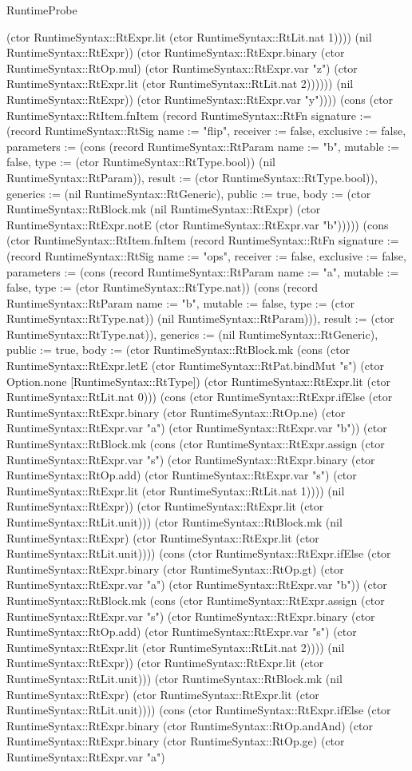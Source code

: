 \begin{lexlean}{RuntimeProbe}
\begin{semanticmodule}
{(ctor RuntimeSyntax::RtExpr.lit (ctor RuntimeSyntax::RtLit.nat 1)))) (nil RuntimeSyntax::RtExpr)) (ctor RuntimeSyntax::RtExpr.binary (ctor RuntimeSyntax::RtOp.mul) (ctor RuntimeSyntax::RtExpr.var "z") (ctor RuntimeSyntax::RtExpr.lit (ctor RuntimeSyntax::RtLit.nat 2)))))) (nil RuntimeSyntax::RtExpr)) (ctor RuntimeSyntax::RtExpr.var "y"))})) (cons (ctor RuntimeSyntax::RtItem.fnItem (record RuntimeSyntax::RtFn {signature := (record RuntimeSyntax::RtSig {name := "flip", receiver := false, exclusive := false, parameters := (cons (record RuntimeSyntax::RtParam {name := "b", mutable := false, type := (ctor RuntimeSyntax::RtType.bool)}) (nil RuntimeSyntax::RtParam)), result := (ctor RuntimeSyntax::RtType.bool)}), generics := (nil RuntimeSyntax::RtGeneric), public := true, body := (ctor RuntimeSyntax::RtBlock.mk (nil RuntimeSyntax::RtExpr) (ctor RuntimeSyntax::RtExpr.notE (ctor RuntimeSyntax::RtExpr.var "b")))})) (cons (ctor RuntimeSyntax::RtItem.fnItem (record RuntimeSyntax::RtFn {signature := (record RuntimeSyntax::RtSig {name := "ops", receiver := false, exclusive := false, parameters := (cons (record RuntimeSyntax::RtParam {name := "a", mutable := false, type := (ctor RuntimeSyntax::RtType.nat)}) (cons (record RuntimeSyntax::RtParam {name := "b", mutable := false, type := (ctor RuntimeSyntax::RtType.nat)}) (nil RuntimeSyntax::RtParam))), result := (ctor RuntimeSyntax::RtType.nat)}), generics := (nil RuntimeSyntax::RtGeneric), public := true, body := (ctor RuntimeSyntax::RtBlock.mk (cons (ctor RuntimeSyntax::RtExpr.letE (ctor RuntimeSyntax::RtPat.bindMut "s") (ctor Option.none [RuntimeSyntax::RtType]) (ctor RuntimeSyntax::RtExpr.lit (ctor RuntimeSyntax::RtLit.nat 0))) (cons (ctor RuntimeSyntax::RtExpr.ifElse (ctor RuntimeSyntax::RtExpr.binary (ctor RuntimeSyntax::RtOp.ne) (ctor RuntimeSyntax::RtExpr.var "a") (ctor RuntimeSyntax::RtExpr.var "b")) (ctor RuntimeSyntax::RtBlock.mk (cons (ctor RuntimeSyntax::RtExpr.assign (ctor RuntimeSyntax::RtExpr.var "s") (ctor RuntimeSyntax::RtExpr.binary (ctor RuntimeSyntax::RtOp.add) (ctor RuntimeSyntax::RtExpr.var "s") (ctor RuntimeSyntax::RtExpr.lit (ctor RuntimeSyntax::RtLit.nat 1)))) (nil RuntimeSyntax::RtExpr)) (ctor RuntimeSyntax::RtExpr.lit (ctor RuntimeSyntax::RtLit.unit))) (ctor RuntimeSyntax::RtBlock.mk (nil RuntimeSyntax::RtExpr) (ctor RuntimeSyntax::RtExpr.lit (ctor RuntimeSyntax::RtLit.unit)))) (cons (ctor RuntimeSyntax::RtExpr.ifElse (ctor RuntimeSyntax::RtExpr.binary (ctor RuntimeSyntax::RtOp.gt) (ctor RuntimeSyntax::RtExpr.var "a") (ctor RuntimeSyntax::RtExpr.var "b")) (ctor RuntimeSyntax::RtBlock.mk (cons (ctor RuntimeSyntax::RtExpr.assign (ctor RuntimeSyntax::RtExpr.var "s") (ctor RuntimeSyntax::RtExpr.binary (ctor RuntimeSyntax::RtOp.add) (ctor RuntimeSyntax::RtExpr.var "s") (ctor RuntimeSyntax::RtExpr.lit (ctor RuntimeSyntax::RtLit.nat 2)))) (nil RuntimeSyntax::RtExpr)) (ctor RuntimeSyntax::RtExpr.lit (ctor RuntimeSyntax::RtLit.unit))) (ctor RuntimeSyntax::RtBlock.mk (nil RuntimeSyntax::RtExpr) (ctor RuntimeSyntax::RtExpr.lit (ctor RuntimeSyntax::RtLit.unit)))) (cons (ctor RuntimeSyntax::RtExpr.ifElse (ctor RuntimeSyntax::RtExpr.binary (ctor RuntimeSyntax::RtOp.andAnd) (ctor RuntimeSyntax::RtExpr.binary (ctor RuntimeSyntax::RtOp.ge) (ctor RuntimeSyntax::RtExpr.var "a") }
\end{semanticmodule}
\end{lexlean}
